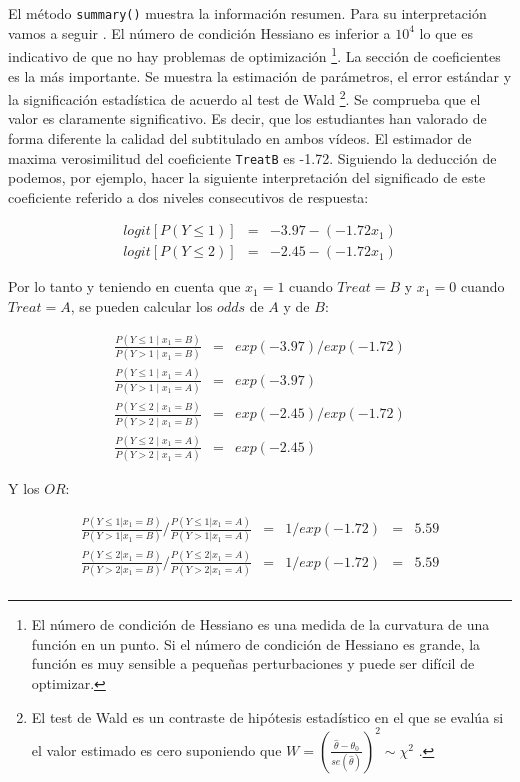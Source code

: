 \documentclass[
  12pt,
  a4paper,
  extrafontsizes,
  onecolumn,
  openright,
  table]{memoir}
\begin{document}
\normalsize

El método \texttt{summary()} muestra la información resumen. Para su
interpretación vamos a seguir \textcite{christensen2018CumulativeLM}. El
número de condición Hessiano es inferior a \(10^4\) lo que es indicativo
de que no hay problemas de optimización \footnote{El número de condición
  de Hessiano es una medida de la curvatura de una función en un punto.
  Si el número de condición de Hessiano es grande, la función es muy
  sensible a pequeñas perturbaciones y puede ser difícil de optimizar.}.
La sección de coeficientes es la más importante. Se muestra la
estimación de parámetros, el error estándar y la significación
estadística de acuerdo al test de Wald \footnote{El test de Wald es un
  contraste de hipótesis estadístico en el que se evalúa si el valor
  estimado es cero suponiendo que
  \(W = \left(\frac{\hat{\theta} - \theta_0}{se(\hat{\theta})}\right)^2 \sim \chi^{2}\)
  .}. Se comprueba que el valor es claramente significativo. Es decir,
que los estudiantes han valorado de forma diferente la calidad del
subtitulado en ambos vídeos. El estimador de maxima verosimilitud del
coeficiente \texttt{TreatB} es -1.72. Siguiendo la deducción de
\textcite{bruin2011} podemos, por ejemplo, hacer la siguiente
interpretación del significado de este coeficiente referido a dos
niveles consecutivos de respuesta:

\[
\begin{aligned}
logit [P(Y \le 1)] & = & -3.97 - (-1.72 x_1) \\
logit [P(Y \le 2)] & = & -2.45 - (-1.72 x_1)
\end{aligned}
\]

Por lo tanto y teniendo en cuenta que \(x_1 = 1\) cuando \(Treat = B\) y
\(x_1 = 0\) cuando \(Treat = A\), se pueden calcular los \(odds\) de
\(A\) y de \(B\):

\[
\begin{aligned}
\frac{P(Y \le 1 \mid x_1 = B)}{P(Y > 1 \mid x_1 = B)} & = & exp(-3.97)/exp(-1.72) \\
\frac{P(Y \le 1 \mid x_1 = A)}{P(Y > 1 \mid x_1 = A)} & = & exp(-3.97) \\
\frac{P(Y \le 2 \mid x_1 = B)}{P(Y > 2 \mid x_1 = B)} & = & exp(-2.45)/exp(-1.72) \\
\frac{P(Y \le 2 \mid x_1 = A)}{P(Y > 2 \mid x_1 = A)} & = & exp(-2.45)
\end{aligned}
\]

Y los \(OR\):

\[
\begin{aligned}
\frac{P(Y \le 1 | x_1=B)}{P(Y > 1 | x_1=B)} / \frac{P(Y \le 1 | x_1=A)}{P(Y > 1 | x_1=A)} & = & 1/exp(-1.72) & = & 5.59 \\
\frac{P(Y \le 2 | x_1=B)}{P(Y > 2 | x_1=B)} / \frac{P(Y \le 2 | x_1=A)}{P(Y > 2 | x_1=A)} & = & 1/exp(-1.72) & = & 5.59 \\
\end{aligned}
\]
\end{document}

